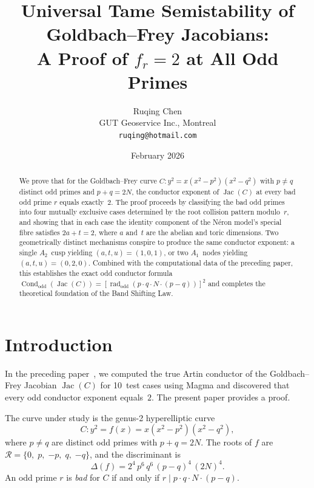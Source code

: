 \documentclass[11pt,a4paper]{article}
\title{Universal Tame Semistability of Goldbach--Frey Jacobians:\\
  A Proof of $f_r = 2$ at All Odd Primes}
\author{Ruqing Chen\\[4pt]
  \small GUT Geoservice Inc., Montreal\\
  \small\texttt{ruqing@hotmail.com}}
\date{February 2026}
\newcommand{\rad}{\operatorname{rad}}
\newcommand{\Jac}{\operatorname{Jac}}
\newcommand{\Cond}{\operatorname{Cond}}
\theoremstyle{definition}
\theoremstyle{remark}
\begin{document}
\maketitle

\begin{abstract}
We prove that for the Goldbach--Frey curve
$C\colon y^2 = x(x^2 - p^2)(x^2 - q^2)$ with $p \ne q$
distinct odd primes and $p + q = 2N$, the conductor exponent
of $\Jac(C)$ at every bad odd prime $r$ equals exactly~$2$.
The proof proceeds by classifying the bad odd primes into four
mutually exclusive cases determined by the root collision
pattern modulo~$r$, and showing that in each case the
identity component of the N\'eron model's special fibre
satisfies $2a + t = 2$, where $a$ and~$t$ are the abelian
and toric dimensions.  Two geometrically distinct mechanisms
conspire to produce the same conductor exponent: a single
$A_2$~cusp yielding $(a,t,u) = (1,0,1)$, or two
$A_1$~nodes yielding $(a,t,u) = (0,2,0)$.
Combined with the computational data of the preceding
paper, this establishes the exact odd conductor formula
$\Cond_{\mathrm{odd}}(\Jac(C))
= [\rad_{\mathrm{odd}}(p \cdot q \cdot N \cdot (p - q))]^2$
and completes the theoretical foundation of the Band Shifting Law.
\end{abstract}


\section{Introduction}

In the preceding paper~\cite{Chen2026TCV}, we computed the true Artin
conductor of the Goldbach--Frey Jacobian $\Jac(C)$ for 10~test cases
using Magma and discovered that every odd conductor exponent
equals~$2$.  The present paper provides a proof.

The curve under study is the genus-2 hyperelliptic curve
\begin{equation}\label{eq:curve}
  C \colon y^2 = f(x) = x(x^2 - p^2)(x^2 - q^2),
\end{equation}
where $p \ne q$ are distinct odd primes with $p + q = 2N$.
The roots of $f$ are
$\mathcal{R} = \{0,\; p,\; {-p},\; q,\; {-q}\}$,
and the discriminant is
\begin{equation}\label{eq:disc}
  \Delta(f) = 2^4\, p^6\, q^6\, (p - q)^4\, (2N)^4.
\end{equation}
An odd prime $r$ is \emph{bad} for $C$ if and only if
$r \mid p \cdot q \cdot N \cdot (p - q)$.
\end{document}
